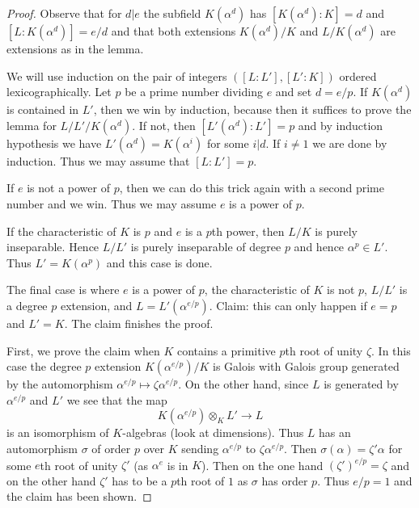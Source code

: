 \begin{proof}
Observe that for $d | e$ the subfield $K(\alpha^d)$ has
$[K(\alpha^d) : K] = d$ and $[L : K(\alpha^d)] = e/d$
and that both extensions $K(\alpha^d)/K$ and $L/K(\alpha^d)$
are extensions as in the lemma.

\medskip\noindent
We will use induction on the pair of integers $([L : L'], [L' : K])$
ordered lexicographically.
Let $p$ be a prime number dividing $e$ and set $d = e/p$.
If $K(\alpha^d)$ is contained in $L'$, then we win
by induction, because then it suffices to prove the lemma
for $L/L'/K(\alpha^d)$. If not, then $[L'(\alpha^d) : L'] = p$
and by induction hypothesis we have $L'(\alpha^d) = K(\alpha^i)$
for some $i | d$. If $i \not = 1$ we are done by induction.
Thus we may assume that $[L : L'] = p$.

\medskip\noindent
If $e$ is not a power of $p$, then we can do this trick
again with a second prime number and we win. Thus we may
assume $e$ is a power of $p$.

\medskip\noindent
If the characteristic of $K$ is $p$ and $e$ is a $p$th power, then
$L/K$ is purely inseparable. Hence $L/L'$ is purely inseparable
of degree $p$ and hence $\alpha^p \in L'$.
Thus $L' = K(\alpha^p)$ and this case is done.

\medskip\noindent
The final case is where $e$ is a power of $p$,
the characteristic of $K$ is not $p$,
$L/L'$ is a degree $p$ extension, and
$L = L'(\alpha^{e/p})$. Claim: this can
only happen if $e = p$ and $L' = K$. The claim finishes the proof.

\medskip\noindent
First, we prove the claim when $K$ contains a primitive
$p$th root of unity $\zeta$. In this case the degree $p$ extension
$K(\alpha^{e/p})/K$ is Galois with Galois group generated
by the automorphism $\alpha^{e/p} \mapsto \zeta \alpha^{e/p}$.
On the other hand, since $L$ is generated by
$\alpha^{e/p}$ and $L'$ we see that the map
$$
K(\alpha^{e/p}) \otimes_K L' \longrightarrow L
$$
is an isomorphism of $K$-algebras (look at dimensions).
Thus $L$ has an automorphism $\sigma$ of order $p$ over $K$ sending
$\alpha^{e/p}$ to $\zeta \alpha^{e/p}$. Then
$\sigma(\alpha) = \zeta' \alpha$ for some $e$th root of unity $\zeta'$
(as $\alpha^e$ is in $K$).
Then on the one hand $(\zeta')^{e/p} = \zeta$ and on the other
hand $\zeta'$ has to be a $p$th root of $1$ as $\sigma$
has order $p$. Thus $e/p = 1$ and the claim has been shown.


\end{proof}

